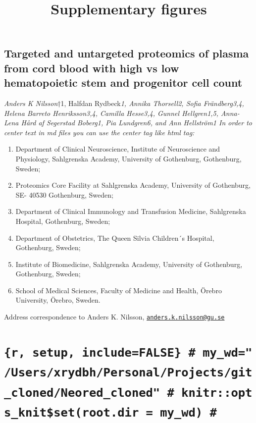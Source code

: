 \documentclass[
]{article}
\title{Supplementary figures}
\author{}
\date{\vspace{-2.5em}}
\providecommand{\tightlist}{%
  \setlength{\itemsep}{0pt}\setlength{\parskip}{0pt}}
\begin{document}
\maketitle

\hypertarget{targeted-and-untargeted-proteomics-of-plasma-from-cord-blood-with-high-vs-low-hematopoietic-stem-and-progenitor-cell-count}{%
\subsection{Targeted and untargeted proteomics of plasma from cord blood
with high vs low hematopoietic stem and progenitor cell
count}\label{targeted-and-untargeted-proteomics-of-plasma-from-cord-blood-with-high-vs-low-hematopoietic-stem-and-progenitor-cell-count}}

\emph{Anders K Nilsson}†1, Halfdan Rydbeck\emph{1, Annika Thorsell2,
Sofia Frändberg3,4, Helena Barreto Henriksson3,4, Camilla Hesse3,4,
Gunnel Hellgren1,5, Anna-Lena Hård af Segerstad Boberg1, Pia Lundgren6,
and Ann Hellström1 In order to center text in md files you can use the
center tag like html tag: }

\begin{enumerate}
\def\labelenumi{\arabic{enumi})}
\tightlist
\item
  Department of Clinical Neuroscience, Institute of Neuroscience and
  Physiology, Sahlgrenska Academy, University of Gothenburg, Gothenburg,
  Sweden;
\item
  Proteomics Core Facility at Sahlgrenska Academy, University of
  Gothenburg, SE- 40530 Gothenburg, Sweden;
\item
  Department of Clinical Immunology and Transfusion Medicine,
  Sahlgrenska Hospital, Gothenburg, Sweden;
\item
  Department of Obstetrics, The Queen Silvia Children´s Hospital,
  Gothenburg, Sweden;
\item
  Institute of Biomedicine, Sahlgrenska Academy, University of
  Gothenburg, Gothenburg, Sweden;
\item
  School of Medical Sciences, Faculty of Medicine and Health, Örebro
  University, Örebro, Sweden.
\end{enumerate}

Address correspondence to Anders K. Nilsson,
\href{mailto:anders.k.nilsson@gu.se}{\nolinkurl{anders.k.nilsson@gu.se}}

\hypertarget{r-setup-includefalse-my_wdusersxrydbhpersonalprojectsgit_clonedneored_cloned-knitropts_knitsetroot.dir-my_wd}{%
\section{\texorpdfstring{\texttt{\{r,\ setup,\ include=FALSE\}\ \#\ my\_wd="/Users/xrydbh/Personal/Projects/git\_cloned/Neored\_cloned"\ \#\ knitr::opts\_knit\$set(root.dir\ =\ my\_wd)\ \#}}{\{r, setup, include=FALSE\} \# my\_wd="/Users/xrydbh/Personal/Projects/git\_cloned/Neored\_cloned" \# knitr::opts\_knit\$set(root.dir = my\_wd) \#}}\label{r-setup-includefalse-my_wdusersxrydbhpersonalprojectsgit_clonedneored_cloned-knitropts_knitsetroot.dir-my_wd}}
\end{document}
